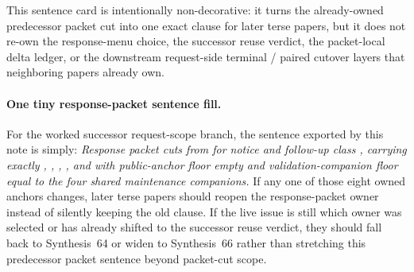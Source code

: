 \documentclass[11pt]{article}
\begin{document}
This sentence card is intentionally non-decorative: it turns the already-owned predecessor packet cut into one exact clause for later terse papers, but it does not re-own the response-menu choice, the successor reuse verdict, the packet-local delta ledger, or the downstream request-side terminal / paired cutover layers that neighboring papers already own.\cite{series:workedexample}

\paragraph{One tiny response-packet sentence fill.}
For the worked successor request-scope branch, the sentence exported by this note is simply: \emph{Response packet  cuts  from  for notice  and follow-up class , carrying exactly , , , , and  with public-anchor floor empty and validation-companion floor equal to the four shared maintenance companions.} If any one of those eight owned anchors changes, later terse papers should reopen the response-packet owner instead of silently keeping the old clause. If the live issue is still which owner was selected or has already shifted to the successor reuse verdict, they should fall back to Synthesis~64 or widen to Synthesis~66 rather than stretching this predecessor packet sentence beyond packet-cut scope.\cite{series:workedexample}
\end{document}
